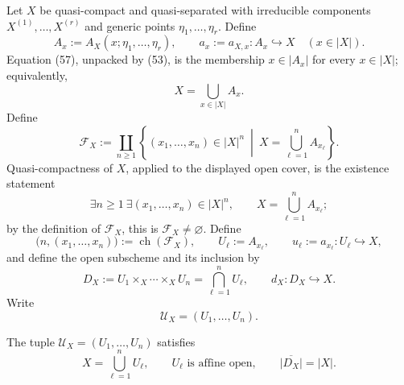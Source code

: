 \begin{definition}
  \label{def:nagata-dense-affine-cover}
  \lean{}

  Let $X$ be quasi-compact and quasi-separated with irreducible components
  $X^{(1)},\ldots,X^{(r)}$ and generic points
  $\eta_1,\ldots,\eta_r$.  Define
  \[
    A_x:=A_X(x;\eta_1,\ldots,\eta_r),
    \qquad a_x:=a_{X,x}\colon A_x\hookrightarrow X
    \quad(x\in|X|).
  \]
  Equation (57), unpacked by (53), is the membership
  $x\in|A_x|$ for every $x\in|X|$; equivalently,
  \[
    X=\bigcup_{x\in|X|}A_x.
  \]
  Define
  \[
    \mathscr F_X
      :=\coprod_{n\geq1}
        \left\{
          (x_1,\ldots,x_n)\in|X|^n\ \middle|\
          X=\bigcup_{\ell=1}^nA_{x_\ell}
        \right\}.
  \]
  Quasi-compactness of $X$, applied to the displayed open cover, is the
  existence statement
  \[
    \exists n\geq1\ \exists(x_1,\ldots,x_n)\in|X|^n,\qquad
      X=\bigcup_{\ell=1}^nA_{x_\ell};
  \]
  by the definition of $\mathscr F_X$, this is
  $\mathscr F_X\neq\varnothing$.  Define
  \[
    \bigl(n,(x_1,\ldots,x_n)\bigr)
      :=\operatorname{ch}(\mathscr F_X),\qquad
    U_\ell:=A_{x_\ell},\qquad
    u_\ell:=a_{x_\ell}\colon U_\ell\hookrightarrow X,
  \]
  and define the open subscheme and its inclusion by
  \[
    D_X:=U_1\times_X\cdots\times_XU_n
      =\bigcap_{\ell=1}^nU_\ell,
    \qquad d_X\colon D_X\hookrightarrow X.                       \tag{58}
  \]
  Write
  \[
    \mathcal U_X=(U_1,\ldots,U_n).
  \]
\end{definition}

\begin{lemma}
  \label{lemma:nagata-dense-affine-cover}
  \lean{}

  The tuple $\mathcal U_X=(U_1,\ldots,U_n)$ satisfies
  \[
    X=\bigcup_{\ell=1}^nU_\ell,\qquad
    U_\ell\text{ is affine open},
    \qquad
    \overline{|D_X|}=|X|.
  \]
\end{lemma}

